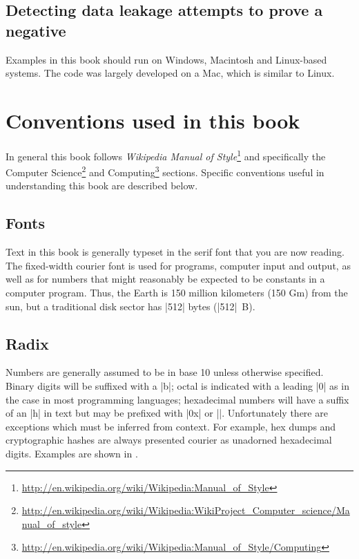 \subsection{Detecting data leakage attempts to prove a negative}


Examples in this book should run on Windows, Macintosh and Linux-based
systems. The code was largely developed on a Mac, which is similar to
Linux. 

\section{Conventions used in this book}
In general this book follows \emph{Wikipedia Manual of
  Style}\footnote{\url{http://en.wikipedia.org/wiki/Wikipedia:Manual_of_Style}}
and specifically the Computer
Science\footnote{\url{http://en.wikipedia.org/wiki/Wikipedia:WikiProject_Computer_science/Manual_of_style}}
  and
  Computing\footnote{\url{http://en.wikipedia.org/wiki/Wikipedia:Manual_of_Style/Computing}}
  sections. Specific conventions useful in understanding this book are
  described below.

\subsection{Fonts}

Text in this book is generally typeset in the serif font that you are
now reading. The fixed-width courier font is used for programs,
computer input and output, as well as for numbers that might
reasonably be expected to be constants in a computer program. Thus,
the Earth is 150 million kilometers (150 Gm) from the sun, but a
traditional disk sector has |512| bytes (|512|~B).

\subsection{Radix}
Numbers are generally assumed to be in base 10 unless otherwise
specified. Binary digits will be suffixed with a |b|; octal
is indicated with a leading |0| as in the case in most programming
languages; hexadecimal numbers will have a suffix of an |h| in text
but may be prefixed with |0x| or |\x|. Unfortunately there are
exceptions which must be inferred from context. For example, hex dumps
and cryptographic hashes are always presented courier as unadorned hexadecimal
digits. Examples are shown in .

